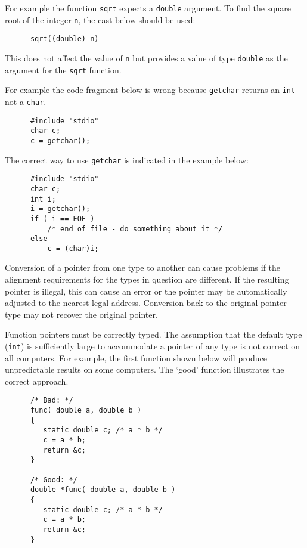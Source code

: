 
For example the function {\tt sqrt} expects a {\tt double} argument.
To find the square root of the integer {\tt n}, the cast below should be 
used:
\begin{verbatim}
      sqrt((double) n)
\end{verbatim}
This does not affect the value of {\tt n} but provides a value of type 
{\tt double} as the argument for the {\tt sqrt} function.



For example the code fragment below is wrong because {\tt getchar} returns 
an {\tt int} not a {\tt char}.
\begin{verbatim}
      #include "stdio"
      char c;
      c = getchar();
\end{verbatim}
The correct way to use {\tt getchar} is indicated in the example below:
\begin{verbatim}
      #include "stdio"
      char c;
      int i;
      i = getchar();
      if ( i == EOF )
          /* end of file - do something about it */
      else
          c = (char)i;                                  
\end{verbatim}


Conversion of a pointer from one type to another can cause problems if the 
alignment requirements for the types in question are different.
If the resulting pointer is illegal, this can cause an error or the pointer 
may
be automatically adjusted to the nearest legal address.
Conversion back to the original pointer type may not recover the original
pointer.


Function pointers must be correctly typed.
The assumption that the default
type ({\tt int}) is sufficiently large to accommodate a pointer of any
type is not correct on all computers. 
For example,  the first function shown below will produce unpredictable
results on some computers. 
The `good' function illustrates the correct approach.
\begin{verbatim}
      /* Bad: */
      func( double a, double b )
      {
         static double c; /* a * b */
         c = a * b;
         return &c;
      }

      /* Good: */
      double *func( double a, double b )
      {
         static double c; /* a * b */
         c = a * b;
         return &c;
      }
\end{verbatim}

